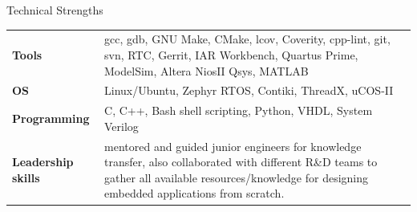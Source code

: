 \documentclass[
	a4paper, %
	11pt, %
]{resume} %
\begin{document}
\begin{rSection}{Technical Strengths}

	\begin{tabular}[t]{m{3cm} m{14cm}}
		\textbf{Tools} & gcc, gdb, GNU Make, CMake, lcov, Coverity, cpp-lint, git, svn, RTC, Gerrit, IAR
Workbench, Quartus Prime, ModelSim, Altera NiosII Qsys, MATLAB \\
            \textbf{OS} & Linux/Ubuntu, Zephyr RTOS, Contiki, ThreadX, uCOS-II \\
            \textbf{Programming} & C, C++, Bash shell scripting, Python, VHDL, System Verilog \\
		\textbf{Leadership skills} & mentored and guided junior engineers for knowledge transfer, also collaborated with different R\&D teams to gather all available resources/knowledge for designing embedded applications from scratch.

	\end{tabular}
 
\end{rSection}

\end{document}
